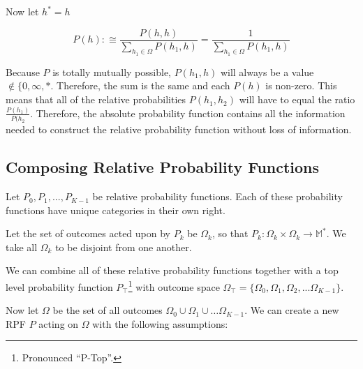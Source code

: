 \documentclass[twoside]{article}
\newcommand{\quotes}[1]{``#1''}
\begin{document}
Now let \(h^* = h\)

\[P(h):\cong \frac{P(h, h)}{\sum_{h_1 \in \Omega} P(h_1, h)}=\frac{1}{\sum_{h_1 \in \Omega} P(h_1, h)}\]

Because \(P\) is totally mutually possible, \(P(h_1, h)\) will always be a value \(\notin \{0, \infty, \ast\). Therefore, the sum is the same and each \(P(h)\) is non-zero. This means that all of the relative probabilities \(P(h_1, h_2)\) will have to equal the ratio \(\frac{P(h_1)}{P(h_2}\). Therefore, the absolute probability function contains all the information needed to construct the relative probability function without loss of information.

\subsection{Composing Relative Probability Functions}

Let \(P_0, P_1, ..., P_{K-1}\) be relative probability functions. Each of these probability functions have unique categories in their own right.

Let the set of outcomes acted upon by \(P_k\) be \(\Omega_k\), so that \(P_k: \Omega_k \times \Omega_k \rightarrow \mathbb{M}^{\ast}\). We take all \(\Omega_k\) to be disjoint from one another.

We can combine all of these relative probability functions together with a top level probability function \(P_\top\)\footnote{Pronounced \quotes{P-Top}.} with outcome space \(\Omega_\top = \{\Omega_0, \Omega_1, \Omega_2, ... \Omega_{K- 1}\}\).


Now let \(\Omega\) be the set of all outcomes \(\Omega_0 \cup \Omega_1 \cup \dots \Omega_{K-1}\). We can create a new RPF \(P\) acting on \(\Omega\) with the following assumptions:
\end{document}
